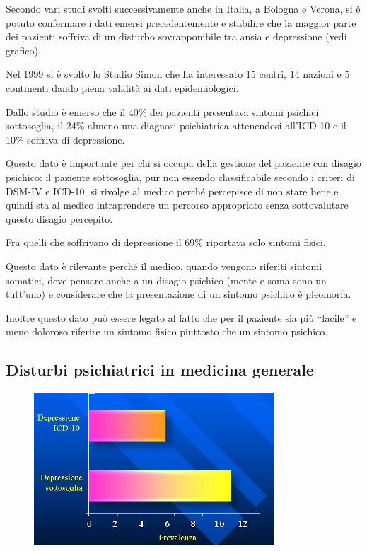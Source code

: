 Secondo
vari studi svolti successivamente anche in Italia, a Bologna e Verona,
si è potuto confermare i dati emersi precedentemente e stabilire che la
maggior parte dei pazienti soffriva di un disturbo sovrapponibile tra
ansia e depressione (vedi grafico).

Nel 1999 si è svolto lo Studio Simon che ha interessato 15 centri, 14
nazioni e 5 continenti dando piena validità ai dati epidemiologici.

Dallo studio è emerso che il 40\% dei pazienti presentava sintomi
psichici sottosoglia, il 24\% almeno una diagnosi psichiatrica
attenendosi all'ICD-10 e il 10\% soffriva di depressione.

Questo dato è importante per chi si occupa della gestione del paziente
con disagio psichico: il paziente sottosoglia, pur non essendo
classificabile secondo i criteri di DSM-IV e ICD-10, si rivolge al
medico perché percepisce di non stare bene e quindi sta al medico
intraprendere un percorso appropriato senza sottovalutare questo disagio
percepito.

Fra quelli che soffrivano di depressione il 69\% riportava solo sintomi
fisici.

Questo dato è rilevante perché il medico, quando vengono riferiti
sintomi somatici, deve pensare anche a un disagio psichico (mente e soma
sono un tutt'uno) e considerare che la presentazione di un sintomo
psichico è pleomorfa.

Inoltre questo dato può essere legato al fatto che per il paziente sia
più ``facile'' e meno doloroso riferire un sintomo fisico piuttosto che
un sintomo psichico.

\subsection{Disturbi psichiatrici in medicina generale}

\begin{figure}[!ht]
\centering
	\includegraphics[width=0.8\textwidth]{42/image2.jpeg}
	\end{figure}
	
